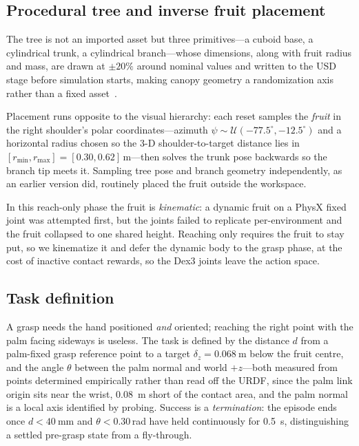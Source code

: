 \documentclass[conference,a4paper]{IEEEtran}
\begin{document}
\subsection{Procedural tree and inverse fruit placement}

The tree is not an imported asset but three primitives---a cuboid base, a
cylindrical trunk, a cylindrical branch---whose dimensions, along with fruit
radius and mass, are drawn at $\pm20\%$ around nominal values and written to the
USD stage before simulation starts, making canopy geometry a randomization
axis rather than a fixed
asset~\cite{shakerimov2023domainrand,ahsen2025domainrand}.

Placement runs opposite to the visual hierarchy: each reset samples the
\emph{fruit} in the right shoulder's polar coordinates---azimuth
$\psi\sim\mathcal{U}(-77.5^\circ,-12.5^\circ)$ and a horizontal radius chosen so
the 3-D shoulder-to-target distance lies in $[r_{\min},r_{\max}] =
[0.30,0.62]$\,m---then solves the trunk pose backwards so the branch tip meets
it. Sampling tree pose and branch geometry independently, as an earlier
version did, routinely placed the fruit outside the workspace.

In this reach-only phase the fruit is \emph{kinematic}: a dynamic fruit on a
PhysX fixed joint was attempted first, but the joints failed to replicate
per-environment and the fruit collapsed to one shared height. Reaching only
requires the fruit to stay put, so we kinematize it and defer the dynamic body
to the grasp phase, at the cost of inactive contact rewards, so the Dex3 joints
leave the action space.

\subsection{Task definition}

A grasp needs the hand positioned \emph{and} oriented; reaching the right point
with the palm facing sideways is useless. The task is defined by the distance
$d$ from a palm-fixed grasp reference point to a target $\delta_z =
\SI{0.068}{\metre}$ below the fruit centre, and the angle $\theta$ between the
palm normal and world $+z$---both measured from points determined empirically
rather than read off the URDF, since the palm link origin sits near the wrist,
\SI{0.08}{\metre} short of the contact area, and the palm normal is a local
axis identified by probing. Success is a \emph{termination}: the episode ends
once $d<\SI{40}{\milli\metre}$ and $\theta<0.30$\,rad have held continuously
for \SI{0.5}{\second}, distinguishing a settled pre-grasp state from a
fly-through.
\end{document}
